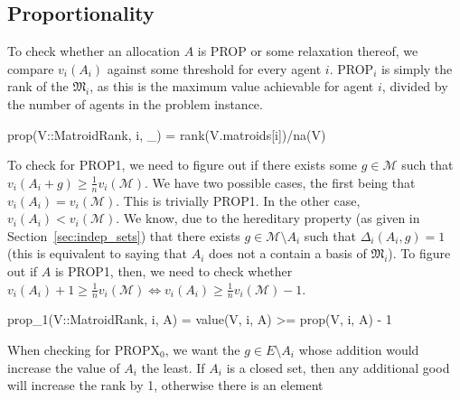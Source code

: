 \subsection*{Proportionality}
To check whether an allocation $A$ is PROP or some relaxation thereof, we compare $v_i(A_i)$ against some threshold for every agent $i$. PROP$_i$ is simply the rank of the $\mathfrak{M}_i$, as this is the maximum value achievable for agent $i$, divided by the number of agents in the problem instance.
\begin{jllisting}
prop(V::MatroidRank, i, _) = rank(V.matroids[i])/na(V)
\end{jllisting}

To check for PROP1, we need to figure out if there exists some $g\in\mathcal{M}$ such that $v_i(A_i+g)\geq \frac{1}{n}v_i(\mathcal{M})$. We have two possible cases, the first being that $v_i(A_i) = v_i(\mathcal{M})$. This is trivially PROP1. In the other case, $v_i(A_i) < v_i(\mathcal{M})$. We know, due to the hereditary property (as given in Section~\ref{sec:indep_sets}) that there exists $g\in\mathcal{M}\setminus A_i$ such that $\Delta_i(A_i, g) = 1$ (this is equivalent to saying that $A_i$ does not a contain a basis of $\mathfrak{M}_i$). To figure out if $A$ is PROP1, then, we need to check whether $v_i(A_i) + 1 \geq \frac{1}{n}v_i(\mathcal{M}) \iff v_i(A_i) \geq \frac{1}{n}v_i(\mathcal{M}) - 1$.
\begin{jllisting}
prop_1(V::MatroidRank, i, A) = value(V, i, A) >= prop(V, i, A) - 1
\end{jllisting}

When checking for PROPX$_0$, we want the $g\in E\setminus A_i$ whose addition would increase the value of $A_i$ the least. If $A_i$ is a closed set, then any additional good will increase the rank by 1, otherwise there is an element